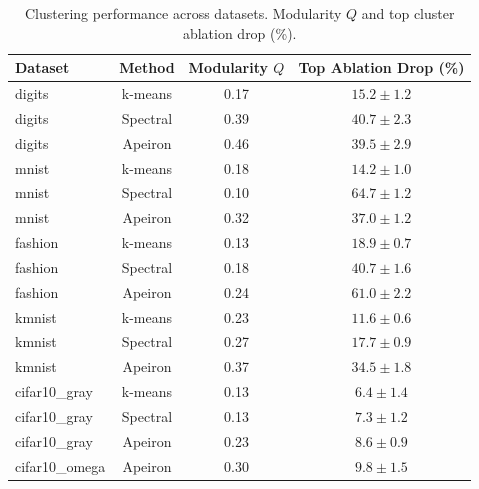 \begin{table}[htbp]
\centering
\caption{Clustering performance across datasets. Modularity $Q$ and top cluster ablation drop (\%).}
\label{tab:all_experiments}
\begin{tabular}{l c c c}
\toprule
\textbf{Dataset} & \textbf{Method} & \textbf{Modularity $Q$} & \textbf{Top Ablation Drop (\%)} \\
\midrule
digits & k-means & 0.17 & $15.2 \pm 1.2$ \\
digits & Spectral & 0.39 & $40.7 \pm 2.3$ \\
digits & Apeiron & 0.46 & $39.5 \pm 2.9$ \\
\midrule
mnist & k-means & 0.18 & $14.2 \pm 1.0$ \\
mnist & Spectral & 0.10 & $64.7 \pm 1.2$ \\
mnist & Apeiron & 0.32 & $37.0 \pm 1.2$ \\
\midrule
fashion & k-means & 0.13 & $18.9 \pm 0.7$ \\
fashion & Spectral & 0.18 & $40.7 \pm 1.6$ \\
fashion & Apeiron & 0.24 & $61.0 \pm 2.2$ \\
\midrule
kmnist & k-means & 0.23 & $11.6 \pm 0.6$ \\
kmnist & Spectral & 0.27 & $17.7 \pm 0.9$ \\
kmnist & Apeiron & 0.37 & $34.5 \pm 1.8$ \\
\midrule
cifar10_gray & k-means & 0.13 & $6.4 \pm 1.4$ \\
cifar10_gray & Spectral & 0.13 & $7.3 \pm 1.2$ \\
cifar10_gray & Apeiron & 0.23 & $8.6 \pm 0.9$ \\
\midrule
cifar10_omega & Apeiron & 0.30 & $9.8 \pm 1.5$ \\
\bottomrule
\end{tabular}
\end{table}